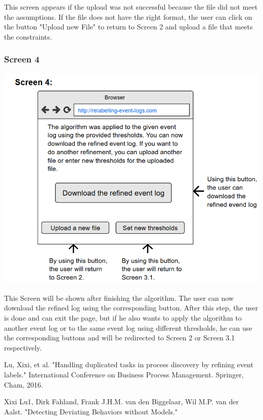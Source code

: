 \documentclass[notitlepage]{article}
\begin{document}
\begin{flushleft}
This screen appears if the upload was not successful because the file did not meet the assumptions. If the file does not have the right format, the user can click on the button "Upload new File" to return to Screen 2 and upload a file that meets the constraints.


\subsubsection{Screen 4}
\includegraphics[scale=0.8]{InterfaceMockup4.png}

This Screen will be shown after finishing the algorithm. The user can now download the refined log using the corresponding button. After this step, the user is done and can exit the page, but if he also wants to apply the algorithm to another event log or to the same event log using different thresholds, he can use the corresponding buttons and will be redirected to Screen 2 or Screen 3.1 respectively.


%
%  




\end{flushleft}
%



\begin{thebibliography}{5}
Lu, Xixi, et al. "Handling duplicated tasks in process discovery by refining event labels." International Conference on Business Process Management. Springer, Cham, 2016.

Xixi Lu1, Dirk Fahland, Frank J.H.M. van den Biggelaar, Wil M.P. van der Aalst. "Detecting Deviating Behaviors without Models."


\end{thebibliography}
\end{document}
